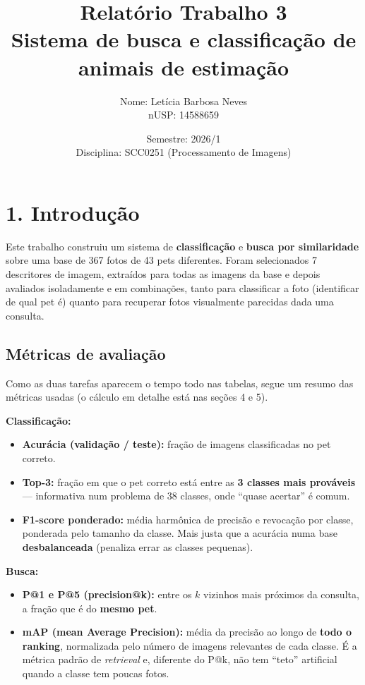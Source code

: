 \documentclass[12pt, a4paper]{article}
\title{Relatório Trabalho 3 \\ \large Sistema de busca e classificação de animais de estimação}
\author{Nome: Letícia Barbosa Neves \\ nUSP: 14588659}
\date{Semestre: 2026/1 \\ Disciplina: SCC0251 (Processamento de Imagens)}
\begin{document}
\maketitle

\section*{1. Introdução}
Este trabalho construiu um sistema de \textbf{classificação} e \textbf{busca por similaridade} sobre uma base de 367 fotos de 43 pets diferentes. Foram selecionados 7 descritores de imagem, extraídos para todas as imagens da base e depois avaliados isoladamente e em combinações, tanto para classificar a foto (identificar de qual pet é) quanto para recuperar fotos visualmente parecidas dada uma consulta.

\subsection*{Métricas de avaliação}
Como as duas tarefas aparecem o tempo todo nas tabelas, segue um resumo das métricas usadas (o cálculo em detalhe está nas seções 4 e 5).

\textbf{Classificação:}
\begin{itemize}
    \item \textbf{Acurácia (validação / teste):} fração de imagens classificadas no pet correto.
    \item \textbf{Top-3:} fração em que o pet correto está entre as \textbf{3 classes mais prováveis} --- informativa num problema de 38 classes, onde ``quase acertar'' é comum.
    \item \textbf{F1-score ponderado:} média harmônica de precisão e revocação por classe, ponderada pelo tamanho da classe. Mais justa que a acurácia numa base \textbf{desbalanceada} (penaliza errar as classes pequenas).
\end{itemize}

\textbf{Busca:}
\begin{itemize}
    \item \textbf{P@1 e P@5 (precision@k):} entre os $k$ vizinhos mais próximos da consulta, a fração que é do \textbf{mesmo pet}.
    \item \textbf{mAP (mean Average Precision):} média da precisão ao longo de \textbf{todo o ranking}, normalizada pelo número de imagens relevantes de cada classe. É a métrica padrão de \textit{retrieval} e, diferente do P@k, não tem ``teto'' artificial quando a classe tem poucas fotos.
\end{itemize}
\end{document}
